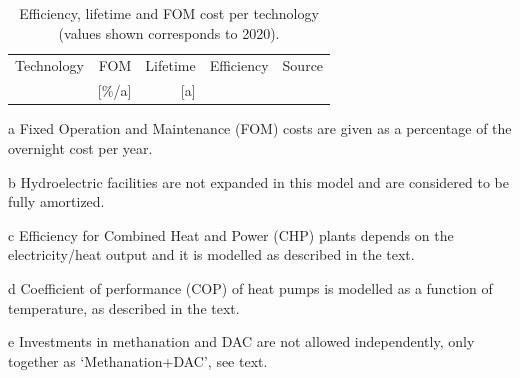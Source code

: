 \documentclass[3p]{elsarticle} %
\begin{document}
\begin{table}
\footnotesize
\centering
\begin{threeparttable}
\caption{Efficiency, lifetime and FOM cost per technology (values shown corresponds to 2020).} \label{tab:inputs}
\centering
\begin{tabularx}{0.8\textwidth}{lrrrr}
\toprule
Technology & FOM\tnote{a} & Lifetime & Efficiency & Source\\
 & [\%/a] & [a] &  & \\
\midrule


\bottomrule
\end{tabularx}

\begin{tablenotes}
\item [a] Fixed Operation and Maintenance (FOM) costs are given as a percentage of the overnight cost per year.
\item [b] Hydroelectric facilities are not expanded in this model and are considered to be fully amortized.
\item [c] Efficiency for Combined Heat and Power (CHP) plants depends on the electricity/heat output and it is modelled as described in the text. 
\item [d] Coefficient of performance (COP) of heat pumps is modelled as a function of temperature, as described in the text. 
\item [e] Investments in methanation and DAC are not allowed independently, only together as `Methanation+DAC', see text. 
\end{tablenotes}
\end{threeparttable}
\end{table}
\end{document}
